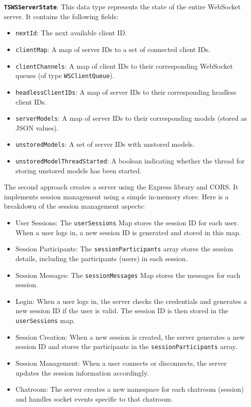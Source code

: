 \textbf{\lstinline{TSWSServerState}}: This data type represents the state of the entire WebSocket server. It contains the following fields:

\begin{itemize}
    \item \lstinline{nextId}: The next available client ID.
    \item \lstinline{clientMap}: A map of server IDs to a set of connected client IDs.
    \item \lstinline{clientChannels}: A map of client IDs to their corresponding WebSocket queues (of type \lstinline{WSClientQueue}).
    \item \lstinline{headlessClientIDs}: A map of server IDs to their corresponding headless client IDs.
    \item \lstinline{serverModels}: A map of server IDs to their corresponding models (stored as JSON values).
    \item \lstinline{unstoredModels}: A set of server IDs with unstored models.
    \item \lstinline{unstoredModelThreadStarted}: A boolean indicating whether the thread for storing unstored models has been started.

\end{itemize}


The second approach creates a server using the Express library and CORS. It implements session management using a simple in-memory store. Here is a breakdown of the session management aspects:

\begin{itemize}
    \item User Sessions: The \lstinline{userSessions} Map stores the session ID for each user. When a user logs in, a new session ID is generated and stored in this map.
    \item Session Participants: The \lstinline{sessionParticipants} array stores the session details, including the participants (users) in each session.
    \item Session Messages: The \lstinline{sessionMessages} Map stores the messages for each session.
    \item Login: When a user logs in, the server checks the credentials and generates a new session ID if the user is valid. The session ID is then stored in the \lstinline{userSessions} map.
    \item Session Creation: When a new session is created, the server generates a new session ID and stores the participants in the \lstinline{sessionParticipants} array.
    \item Session Management: When a user connects or disconnects, the server updates the session information accordingly.
    \item Chatroom: The server creates a new namespace for each chatroom (session) and handles socket events specific to that chatroom.
\end{itemize}

